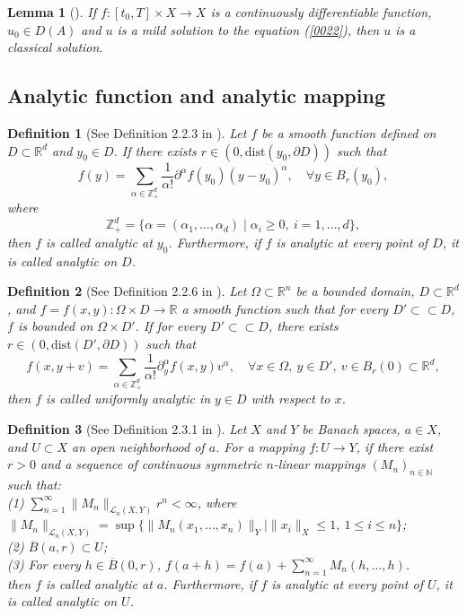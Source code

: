\documentclass{article}
\numberwithin{equation}{section}
\newtheorem{lemma}{Lemma}[section]
\newtheorem{definition}{Definition}[section]
\begin{document}
\begin{lemma}[\cite{ref18}]\label{classic exists 2}
   If $f:\left[t_{0}, T\right] \times X \rightarrow X $ is a continuously differentiable function, $u_{0} \in D(A)$ and $u$ is a mild solution to the equation (\ref{0022}), then $u$ is a classical solution.
\end{lemma}

\subsection{Analytic function and analytic mapping}

\begin{definition}[See Definition 2.2.3 in \cite{ref21}]
    Let $f$ be a smooth function defined on $D\subset \mathbb{R}^d$ and $y_0\in D$. If there exists $r\in (0,\mathrm{dist}(y_0,\partial D))$ such that
    $$f(y)=\sum\limits_{\alpha\in\mathbb{Z}_{+}^d}\frac{1}{\alpha !}\partial^{\alpha}f(y_0)(y-y_0)^{\alpha},\quad \forall y\in B_r(y_0),$$
    where
    $$\mathbb{Z}_{+}^d=\{\alpha=(\alpha_1,\dots,\alpha_d)\mid \alpha_i\ge 0,\ i=1,\dots,d\},$$
    then $f$ is called analytic at $y_0$. Furthermore, if $f$ is analytic at every point of $D$, it is called analytic on $D$.
\end{definition}

\begin{definition}[See Definition 2.2.6 in \cite{ref21}]
    Let $\Omega\subset\mathbb{R}^n$ be a bounded domain, $D\subset \mathbb{R}^d$, and $f=f(x,y):\Omega\times D\to\mathbb{R}$ a smooth function such that for every $D'\subset\subset D$, $f$ is bounded on $\Omega\times D'$. If for every $D'\subset\subset D$, there exists $r\in (0,\mathrm{dist}(D',\partial D))$ such that
    $$f(x,y+v)=\sum\limits_{\alpha\in\mathbb{Z}_{+}^d}\frac{1}{\alpha !}\partial_y^{\alpha}f(x,y)v^{\alpha},\quad \forall x\in\Omega,\ y\in D',\ v\in B_r(0)\subset \mathbb{R}^d,$$
    then $f$ is called uniformly analytic in $y\in D$ with respect to $x$.
\end{definition}

\begin{definition}[See Definition 2.3.1 in \cite{ref13}]
    Let $X$ and $Y$ be Banach spaces, $a\in X$, and $U\subset X$ an open neighborhood of $a$. For a mapping $f:U\to Y$, if there exist $r>0$ and a sequence of continuous symmetric $n$-linear mappings $(M_n)_{n\in \mathbb{N}}$ such that:\\
    (1) $\sum\limits_{n=1}^{\infty}\|M_n\|_{\mathcal{L}_n(X,Y)}r^n<\infty$, where $\|M_n\|_{\mathcal{L}_n(X,Y)}=\sup\{\|M_n(x_1,\dots,x_n)\|_Y\mid \|x_i\|_X\leq1,\ 1\leq i\leq n\}$;\\
    (2) $\overline{B}(a,r)\subset U$;\\
    (3) For every $h\in\overline{B}(0,r)$, $f(a+h)=f(a)+\sum\limits_{n=1}^{\infty}M_n(h,\dots,h)$.\\
    then $f$ is called analytic at $a$. Furthermore, if $f$ is analytic at every point of $U$, it is called analytic on $U$.
\end{definition}
\end{document}
